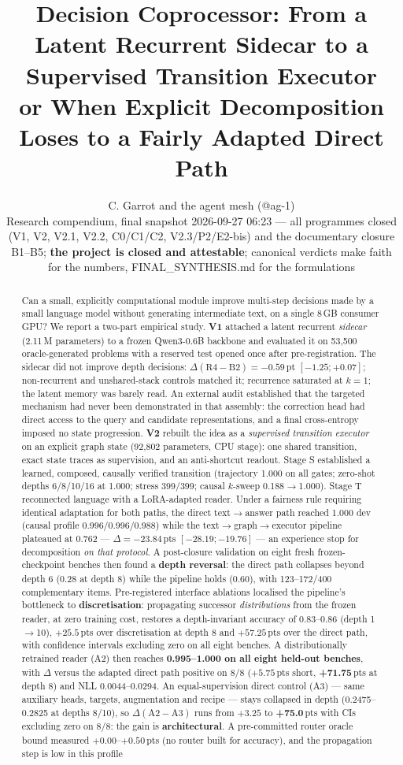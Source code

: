 \documentclass[11pt,a4paper]{article}
\title{\vspace{-1.2cm}\textbf{Decision Coprocessor: From a Latent Recurrent Sidecar to a Supervised Transition Executor}\\[0.35em]
\large or When Explicit Decomposition Loses to a Fairly Adapted Direct Path}
\author{C. Garrot and the agent mesh (@ag-1\ldots@ag-5)\\
\small Research compendium, final snapshot 2026-09-27 06:23 --- all programmes closed (V1, V2, V2.1, V2.2, C0/C1/C2, V2.3/P2/E2-bis) and the documentary closure B1--B5; \textbf{the project is closed and attestable}; canonical verdicts make faith for the numbers, FINAL\_SYNTHESIS.md for the formulations}
\date{}
\newcommand{\dpt}{\ensuremath{\Delta}}
\begin{document}
\maketitle

\begin{abstract}
\noindent
Can a small, explicitly computational module improve multi-step decisions made by a small language model without generating intermediate text, on a single 8\,GB consumer GPU? We report a two-part empirical study. \textbf{V1} attached a latent recurrent \emph{sidecar} (2.11\,M parameters) to a frozen Qwen3-0.6B backbone and evaluated it on 53{,}500 oracle-generated problems with a reserved test opened once after pre-registration. The sidecar did not improve depth decisions: $\dpt(\mathrm{R4}-\mathrm{B2}) = -0.59$\,pt $[-1.25;+0.07]$; non-recurrent and unshared-stack controls matched it; recurrence saturated at $k=1$; the latent memory was barely read. An external audit established that the targeted mechanism had never been demonstrated in that assembly: the correction head had direct access to the query and candidate representations, and a final cross-entropy imposed no state progression. \textbf{V2} rebuilt the idea as a \emph{supervised transition executor} on an explicit graph state (92{,}802 parameters, CPU stage): one shared transition, exact state traces as supervision, and an anti-shortcut readout. Stage S established a learned, composed, causally verified transition (trajectory 1.000 on all gates; zero-shot depths 6/8/10/16 at 1.000; stress 399/399; causal $k$-sweep 0.188$\to$1.000). Stage T reconnected language with a LoRA-adapted reader. Under a fairness rule requiring identical adaptation for both paths, the direct text$\to$answer path reached 1.000 dev (causal profile 0.996/0.996/0.988) while the text$\to$graph$\to$executor pipeline plateaued at 0.762 --- $\dpt=-23.84$\,pts $[-28.19;-19.76]$ --- an experience stop for decomposition \emph{on that protocol}. A post-closure validation on eight fresh frozen-checkpoint benches then found a \textbf{depth reversal}: the direct path collapses beyond depth 6 (0.28 at depth 8) while the pipeline holds (0.60), with 123--172/400 complementary items. Pre-registered interface ablations localised the pipeline's bottleneck to \textbf{discretisation}: propagating successor \emph{distributions} from the frozen reader, at zero training cost, restores a depth-invariant accuracy of 0.83--0.86 (depth 1$\to$10), $+25.5$\,pts over discretisation at depth 8 and $+57.25$\,pts over the direct path, with confidence intervals excluding zero on all eight benches. A distributionally retrained reader (A2) then reaches \textbf{0.995--1.000 on all eight held-out benches}, with $\dpt$ versus the adapted direct path positive on 8/8 ($+5.75$\,pts short, \textbf{+71.75}\,pts at depth 8) and NLL 0.0044--0.0294. An equal-supervision direct control (A3) --- same auxiliary heads, targets, augmentation and recipe --- stays collapsed in depth (0.2475--0.2825 at depths 8/10), so $\dpt(\mathrm{A2}-\mathrm{A3})$ runs from $+3.25$ to \textbf{+75.0}\,pts with CIs excluding zero on 8/8: the gain is \textbf{architectural}. A pre-committed router oracle bound measured $+0.00$--$+0.50$\,pts (no router built for accuracy), and the propagation step is low in this profile 
\end{abstract}
\end{document}
